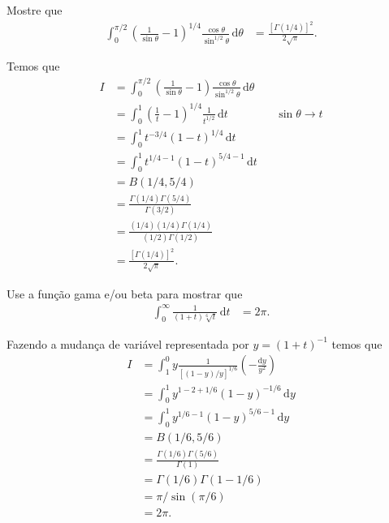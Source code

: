 \documentclass[a4paper,12pt, leqno, answers]{exam}
\begin{document}
\begin{questions}
    \question[P1 de 2012] Mostre que
    \begin{align*}
        \int_0^{\pi/2} \left( \frac{1}{\sin \theta} - 1 \right)^{1/4} \frac{\cos \theta}{\sin^{1/2} \theta} \,\mathrm{d}\theta &= \frac{\left[ \Gamma(1/4) \right]^2}{2 \sqrt{\pi}}.
    \end{align*}
    \begin{solution}
        Temos que
        \begin{align*}
            I &= \int_0^{\pi/2} \left( \frac{1}{\sin \theta} - 1 \right) \frac{\cos \theta}{\sin^{1/2} \theta} \,\mathrm{d}\theta \\
            &= \int_0^1 \left( \frac{1}{t} - 1 \right)^{1/4} \frac{1}{t^{1/2}} \,\mathrm{d}t && \sin \theta \to t \\
            &= \int_0^1 t^{-3/4} \left( 1 - t \right)^{1/4} \,\mathrm{d}t \\
            &= \int_0^1 t^{1/4 - 1} \left( 1 - t \right)^{5/4 - 1} \,\mathrm{d}t \\
            &= B(1/4, 5/4) \\
            &= \frac{\Gamma(1/4) \Gamma(5/4)}{\Gamma(3/2)} \\
            &= \frac{(1/4) (1/4) \Gamma(1/4)}{(1/2) \Gamma(1/2)} \\
            &= \frac{\left[ \Gamma(1/4) \right]^2}{2 \sqrt{\pi}}.
        \end{align*}
    \end{solution}

    \question[E de 2012] Use a fun\c{c}\~{a}o gama e/ou beta para mostrar que
    \begin{align*}
        \int_0^\infty \frac{1}{(1 + t) \sqrt[6]{t}} \,\mathrm{d}t &= 2 \pi.
    \end{align*}
    \begin{solution}
        Fazendo a mudan\c{c}a de vari\'{a}vel representada por $y = \left( 1 + t \right)^{-1}$ temos que
        \begin{align*}
            I &= \int_1^0 y \frac{1}{\left[ (1 - y) / y \right]^{1/6}} \left( - \frac{\mathrm{d}y}{y^2} \right) \\
            &= \int_0^1 y^{1 - 2 + 1/6} \left( 1 - y \right)^{-1/6} \,\mathrm{d}y \\ 
            &= \int_0^1 y^{1/6 - 1} \left( 1 - y \right)^{5/6 - 1} \,\mathrm{d}y \\
            &= B(1/6, 5/6) \\
            &= \frac{\Gamma(1/6) \Gamma(5/6)}{\Gamma(1)} \\
            &= \Gamma(1/6) \Gamma(1 - 1/6) \\
            &= \pi / \sin(\pi/6) \\
            &= 2 \pi.
        \end{align*}
    \end{solution}
\end{questions}
\end{document}
